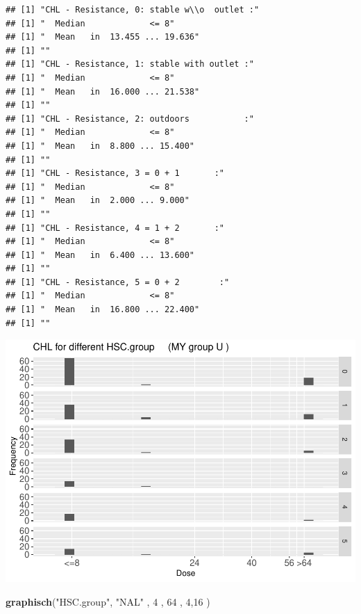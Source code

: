\documentclass[
]{article}
\newenvironment{Shaded}{\begin{snugshade}}{\end{snugshade}}
\newcommand{\DecValTok}[1]{\textcolor[rgb]{0.00,0.00,0.81}{#1}}
\newcommand{\KeywordTok}[1]{\textcolor[rgb]{0.13,0.29,0.53}{\textbf{#1}}}
\newcommand{\NormalTok}[1]{#1}
\newcommand{\StringTok}[1]{\textcolor[rgb]{0.31,0.60,0.02}{#1}}
\begin{document}
\begin{verbatim}
## [1] "CHL - Resistance, 0: stable w\\o  outlet :"
## [1] "  Median             <= 8"
## [1] "  Mean   in  13.455 ... 19.636"
## [1] ""
## [1] "CHL - Resistance, 1: stable with outlet :"
## [1] "  Median             <= 8"
## [1] "  Mean   in  16.000 ... 21.538"
## [1] ""
## [1] "CHL - Resistance, 2: outdoors           :"
## [1] "  Median             <= 8"
## [1] "  Mean   in  8.800 ... 15.400"
## [1] ""
## [1] "CHL - Resistance, 3 = 0 + 1       :"
## [1] "  Median             <= 8"
## [1] "  Mean   in  2.000 ... 9.000"
## [1] ""
## [1] "CHL - Resistance, 4 = 1 + 2       :"
## [1] "  Median             <= 8"
## [1] "  Mean   in  6.400 ... 13.600"
## [1] ""
## [1] "CHL - Resistance, 5 = 0 + 2        :"
## [1] "  Median             <= 8"
## [1] "  Mean   in  16.800 ... 22.400"
## [1] ""
\end{verbatim}

\includegraphics{Verteilungen_files/figure-latex/unnamed-chunk-52-1.pdf}

\begin{Shaded}
\begin{Highlighting}[]
   \KeywordTok{graphisch}\NormalTok{(}\StringTok{"HSC.group"}\NormalTok{, }\StringTok{"NAL"}\NormalTok{ , }\DecValTok{4}\NormalTok{    ,  }\DecValTok{64}\NormalTok{   ,   }\DecValTok{4}\NormalTok{,}\DecValTok{16}\NormalTok{   ) }
\end{Highlighting}
\end{Shaded}
\end{document}
